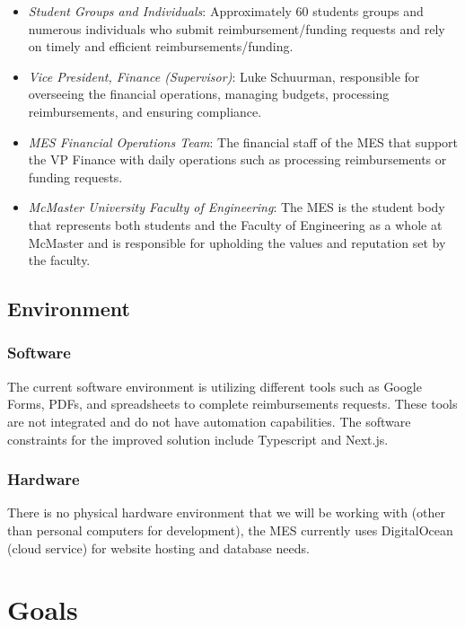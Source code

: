 \documentclass{article}
\begin{document}
\begin{itemize}
    \item \emph{Student Groups and Individuals}: Approximately 60 students groups and numerous individuals who submit reimbursement/funding requests and rely on timely and efficient reimbursements/funding.
    \item \emph{Vice President, Finance (Supervisor)}: Luke Schuurman, responsible for overseeing the financial operations, managing budgets, processing reimbursements, and ensuring compliance.
    \item \emph{MES Financial Operations Team}: The financial staff of the MES that support the VP Finance with daily operations such as processing reimbursements or funding requests. 
    \item \emph{McMaster University Faculty of Engineering}: The MES is the student body that represents both students and the Faculty of Engineering as a whole at McMaster and is responsible for upholding the values and reputation set by the faculty.
\end{itemize}

\subsection{Environment}


\subsubsection{Software}
The current software environment is utilizing different tools such as Google Forms, PDFs, and spreadsheets to complete reimbursements requests. These tools are not integrated and do not have automation capabilities. The software constraints for the improved solution include Typescript and Next.js. 

\subsubsection{Hardware}
There is no physical hardware environment that we will be working with (other than personal computers for development), the MES currently uses DigitalOcean (cloud service) for website hosting and database needs.

\section{Goals}
\end{document}
